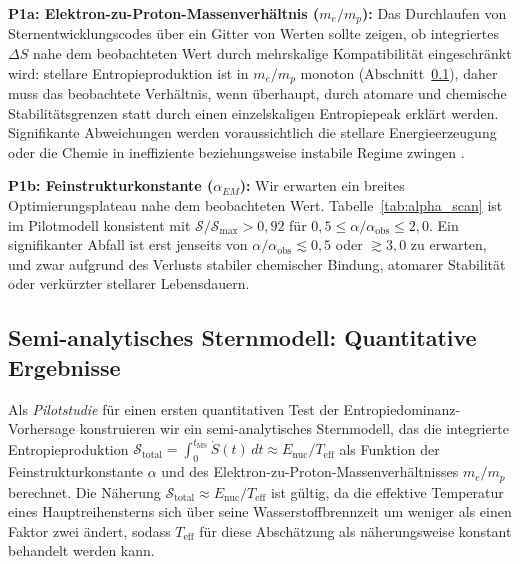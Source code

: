 \documentclass[12pt,a4paper]{article}
\theoremstyle{remark}
\begin{document}
\textbf{P1a: Elektron-zu-Proton-Massenverh\"altnis ($m_e/m_p$):} Das Durchlaufen von Sternentwicklungscodes \"uber ein Gitter von Werten sollte zeigen, ob integriertes $\Delta S$ nahe dem beobachteten Wert durch mehrskalige Kompatibilit\"at eingeschr\"ankt wird: stellare Entropieproduktion ist in $m_e/m_p$ monoton (Abschnitt~\ref{sec:stellar_model}), daher muss das beobachtete Verh\"altnis, wenn \"uberhaupt, durch atomare und chemische Stabilit\"atsgrenzen statt durch einen einzelskaligen Entropiepeak erkl\"art werden. Signifikante Abweichungen werden voraussichtlich die stellare Energieerzeugung oder die Chemie in ineffiziente beziehungsweise instabile Regime zwingen \citep{Adams2019}.

\textbf{P1b: Feinstrukturkonstante ($\alpha_{EM}$):} Wir erwarten ein breites Optimierungsplateau nahe dem beobachteten Wert. Tabelle~\ref{tab:alpha_scan} ist im Pilotmodell konsistent mit $\mathcal{S}/\mathcal{S}_{\max} > 0{,}92$ f\"ur $0{,}5 \leq \alpha/\alpha_{\text{obs}} \leq 2{,}0$. Ein signifikanter Abfall ist erst jenseits von $\alpha/\alpha_{\text{obs}} \lesssim 0{,}5$ oder $\gtrsim 3{,}0$ zu erwarten, und zwar aufgrund des Verlusts stabiler chemischer Bindung, atomarer Stabilit\"at oder verk\"urzter stellarer Lebensdauern.

\subsection{Semi-analytisches Sternmodell: Quantitative Ergebnisse}
\label{sec:stellar_model}

Als \emph{Pilotstudie} f\"ur einen ersten quantitativen Test der Entropiedominanz-Vorhersage konstruieren wir ein semi-analytisches Sternmodell, das die integrierte Entropieproduktion $\mathcal{S}_{\text{total}} = \int_0^{t_{\text{MS}}} \dot{S}(t)\,dt \approx E_{\text{nuc}} / T_{\text{eff}}$ als Funktion der Feinstrukturkonstante $\alpha$ und des Elektron-zu-Proton-Massenverh\"altnisses $m_e/m_p$ berechnet. Die N\"aherung $\mathcal{S}_{\text{total}} \approx E_{\text{nuc}} / T_{\text{eff}}$ ist g\"ultig, da die effektive Temperatur eines Hauptreihensterns sich \"uber seine Wasserstoffbrennzeit um weniger als einen Faktor zwei \"andert, sodass $T_{\text{eff}}$ f\"ur diese Absch\"atzung als n\"aherungsweise konstant behandelt werden kann.
\end{document}
